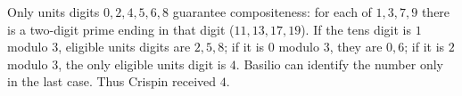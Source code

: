 Only units digits $0,2,4,5,6,8$ guarantee compositeness: for each of $1,3,7,9$ there is a two-digit prime ending in that digit ($11,13,17,19$). If the tens digit is $1$ modulo $3$, eligible units digits are $2,5,8$; if it is $0$ modulo $3$, they are $0,6$; if it is $2$ modulo $3$, the only eligible units digit is $4$. Basilio can identify the number only in the last case. Thus Crispin received $\boxed4$.
